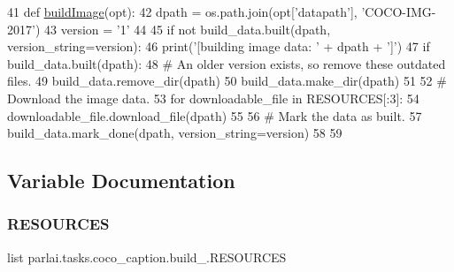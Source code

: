\begin{DoxyCode}
41 \textcolor{keyword}{def }\hyperlink{namespaceparlai_1_1tasks_1_1coco__caption_1_1build__2017_ae85e762d86aa89bda50b2f9b6df4f112}{buildImage}(opt):
42     dpath = os.path.join(opt[\textcolor{stringliteral}{'datapath'}], \textcolor{stringliteral}{'COCO-IMG-2017'})
43     version = \textcolor{stringliteral}{'1'}
44 
45     \textcolor{keywordflow}{if} \textcolor{keywordflow}{not} build\_data.built(dpath, version\_string=version):
46         print(\textcolor{stringliteral}{'[building image data: '} + dpath + \textcolor{stringliteral}{']'})
47         \textcolor{keywordflow}{if} build\_data.built(dpath):
48             \textcolor{comment}{# An older version exists, so remove these outdated files.}
49             build\_data.remove\_dir(dpath)
50         build\_data.make\_dir(dpath)
51 
52         \textcolor{comment}{# Download the image data.}
53         \textcolor{keywordflow}{for} downloadable\_file \textcolor{keywordflow}{in} RESOURCES[:3]:
54             downloadable\_file.download\_file(dpath)
55 
56         \textcolor{comment}{# Mark the data as built.}
57         build\_data.mark\_done(dpath, version\_string=version)
58 
59 
\end{DoxyCode}


\subsection{Variable Documentation}
\mbox{\label{namespaceparlai_1_1tasks_1_1coco__caption_1_1build__2017_a3e665907435d9aac4b0b9e567934c06e}} 
\subsubsection{\texorpdfstring{R\+E\+S\+O\+U\+R\+C\+ES}{RESOURCES}}
{\footnotesize\ttfamily list parlai.\+tasks.\+coco\+\_\+caption.\+build\+\_.\+R\+E\+S\+O\+U\+R\+C\+ES}

